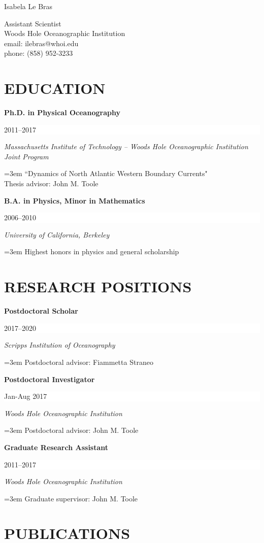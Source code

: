 \documentclass[paper=letter,fontsize=11pt]{scrartcl} %
\newcommand{\sepspace}{\vspace*{3mm}}		%
\newcommand{\MyName}[1]{ %
		\huge  \textbf \hfill #1 %
		\par \normalsize \normalfont}
\newcommand{\MySlogan}[1]{ %
		\large \hfill #1 %
		\par \normalsize \normalfont}
\newcommand{\NewPart}[2]{\section*{\uppercase{#1} #2}}
\newcommand{\EducationEntry}[4]{
		\noindent \textbf{#1} \hfill      %
		\colorbox{White}{%
			\parbox{8em}{%
			\hfill\color{Black}#2}} \par  %
		\noindent \textit{#3} \par        %
		\noindent\hangindent=3em\hangafter=0 #4 %
		 \par}
\begin{document}


\MyName{Isabela Le Bras}
\MySlogan{\vspace{-0.3in}\begin{flushright}Assistant Scientist\\
Woods Hole Oceanographic Institution\\
email: ilebras@whoi.edu\\
phone: (858) 952-3233\\
\end{flushright}}


\NewPart{Education}{}

\EducationEntry{Ph.D. in Physical Oceanography}{2011--2017}{Massachusetts Institute of Technology -- Woods Hole Oceanographic Institution Joint Program}{``Dynamics of North Atlantic Western Boundary Currents"\\
Thesis advisor: John M. Toole}
\sepspace

\EducationEntry{B.A. in Physics, Minor in Mathematics}{2006--2010}{University of California, Berkeley}{Highest honors in physics and general scholarship}

\NewPart{Research Positions}{}

\EducationEntry{{Postdoctoral Scholar}}{2017--2020}{Scripps Institution of Oceanography}{Postdoctoral advisor: Fiammetta Straneo}

\sepspace

\EducationEntry{Postdoctoral Investigator}{Jan-Aug 2017}{Woods Hole Oceanographic Institution}
{Postdoctoral advisor: John M. Toole}

\sepspace

\EducationEntry{Graduate Research Assistant}{2011--2017}{Woods Hole Oceanographic Institution}
{Graduate supervisor: John M. Toole}



\NewPart{Publications}{}
\end{document}

